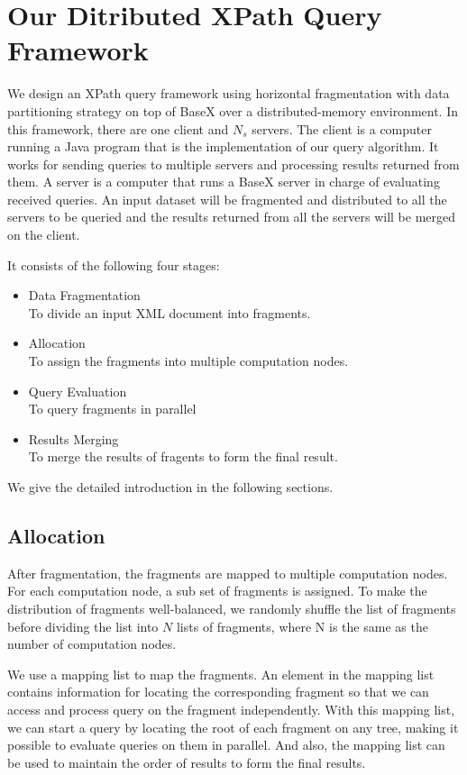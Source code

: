 \section{Our Ditributed XPath Query Framework}

We design an XPath query framework using horizontal fragmentation with data
partitioning strategy on top of BaseX over a distributed-memory environment. 
In this framework, there are one client and $N_s$ servers. The client is a
computer running a Java program that is the implementation of our query
algorithm. It works for sending queries to multiple servers and processing
results returned from them. A server is a computer that runs a BaseX server in
charge of evaluating received queries. An input dataset will be fragmented and
distributed to all the servers to be queried and the results returned from all
the servers will be merged on the client.

It consists of the following four stages:\\
\begin{itemize}
	\item Data Fragmentation \\To divide an input XML document into fragments.
	\item Allocation\\ To assign the fragments into multiple computation nodes.
	\item Query Evaluation\\ To query fragments in parallel
	\item Results Merging\\ To merge the results of fragents to form the final result.
\end{itemize}



We give the detailed introduction in the following sections.



\subsection{Allocation}

After fragmentation, the fragments are mapped to multiple computation nodes. For each
computation node, a sub set of fragments is assigned. To make the distribution
of fragments well-balanced, we randomly shuffle the list of fragments before
dividing the list into $N$ lists of fragments, where N is the same as the number
of computation nodes. 

We use a mapping list to map the fragments. An element in the mapping list
contains information for locating the corresponding fragment so that we can
access and process query on the fragment independently.  With this mapping list,
we can start a query by locating the root of each fragment on any tree, making
it possible to evaluate queries on them in parallel.  And also, the mapping list
can be used to maintain the order of results to form the final results.

